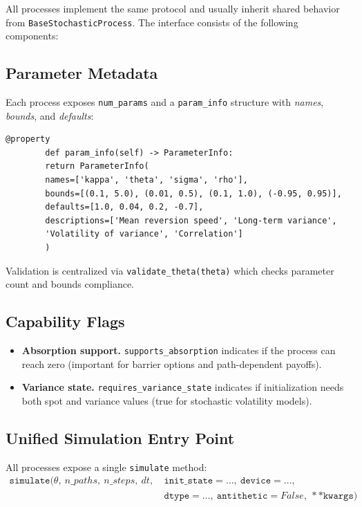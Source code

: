 	All processes implement the same protocol and usually inherit shared behavior from \texttt{BaseStochasticProcess}. The interface consists of the following components:
	
	\subsection{Parameter Metadata}
	Each process exposes \texttt{num\_params} and a \texttt{param\_info} structure with \emph{names}, \emph{bounds}, and \emph{defaults}:
	
	\begin{lstlisting}[style=cleanpy]
		@property
		def param_info(self) -> ParameterInfo:
		return ParameterInfo(
		names=['kappa', 'theta', 'sigma', 'rho'],
		bounds=[(0.1, 5.0), (0.01, 0.5), (0.1, 1.0), (-0.95, 0.95)],
		defaults=[1.0, 0.04, 0.2, -0.7],
		descriptions=['Mean reversion speed', 'Long-term variance',
		'Volatility of variance', 'Correlation']
		)
	\end{lstlisting}
	
	Validation is centralized via \texttt{validate\_theta(theta)} which checks parameter count and bounds compliance.
	
	\subsection{Capability Flags}
	\begin{itemize}[leftmargin=*]
		\item \textbf{Absorption support.} \texttt{supports\_absorption} indicates if the process can reach zero (important for barrier options and path-dependent payoffs).
		\item \textbf{Variance state.} \texttt{requires\_variance\_state} indicates if initialization needs both spot and variance values (true for stochastic volatility models).
	\end{itemize}
	
	\subsection{Unified Simulation Entry Point}
	All processes expose a single \texttt{simulate} method:
	\begin{align*}
		\texttt{simulate}(\theta,\ n\_paths,\ n\_steps,\ dt,\ &\texttt{init\_state}=\ldots,\ \texttt{device}=\ldots,\\\ &\texttt{dtype}=\ldots,\ \texttt{antithetic}=False,\ **\texttt{kwargs})
	\end{align*}
	
